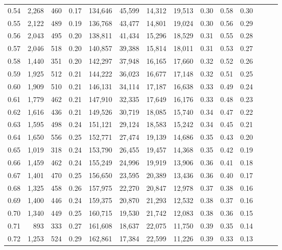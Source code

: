 \begin{tabular}{rrrrrrrrrrrrrr}
0.54 &  2,268 &    460 &  0.17 &  134,646 &   45,599 &  14,312 &  19,513 &  0.30 &  0.58 &      0.30 \\
0.55 &  2,122 &    489 &  0.19 &  136,768 &   43,477 &  14,801 &  19,024 &  0.30 &  0.56 &      0.29 \\
0.56 &  2,043 &    495 &  0.20 &  138,811 &   41,434 &  15,296 &  18,529 &  0.31 &  0.55 &      0.28 \\
0.57 &  2,046 &    518 &  0.20 &  140,857 &   39,388 &  15,814 &  18,011 &  0.31 &  0.53 &      0.27 \\
0.58 &  1,440 &    351 &  0.20 &  142,297 &   37,948 &  16,165 &  17,660 &  0.32 &  0.52 &      0.26 \\
0.59 &  1,925 &    512 &  0.21 &  144,222 &   36,023 &  16,677 &  17,148 &  0.32 &  0.51 &      0.25 \\
0.60 &  1,909 &    510 &  0.21 &  146,131 &   34,114 &  17,187 &  16,638 &  0.33 &  0.49 &      0.24 \\
0.61 &  1,779 &    462 &  0.21 &  147,910 &   32,335 &  17,649 &  16,176 &  0.33 &  0.48 &      0.23 \\
0.62 &  1,616 &    436 &  0.21 &  149,526 &   30,719 &  18,085 &  15,740 &  0.34 &  0.47 &      0.22 \\
0.63 &  1,595 &    498 &  0.24 &  151,121 &   29,124 &  18,583 &  15,242 &  0.34 &  0.45 &      0.21 \\
0.64 &  1,650 &    556 &  0.25 &  152,771 &   27,474 &  19,139 &  14,686 &  0.35 &  0.43 &      0.20 \\
0.65 &  1,019 &    318 &  0.24 &  153,790 &   26,455 &  19,457 &  14,368 &  0.35 &  0.42 &      0.19 \\
0.66 &  1,459 &    462 &  0.24 &  155,249 &   24,996 &  19,919 &  13,906 &  0.36 &  0.41 &      0.18 \\
0.67 &  1,401 &    470 &  0.25 &  156,650 &   23,595 &  20,389 &  13,436 &  0.36 &  0.40 &      0.17 \\
0.68 &  1,325 &    458 &  0.26 &  157,975 &   22,270 &  20,847 &  12,978 &  0.37 &  0.38 &      0.16 \\
0.69 &  1,400 &    446 &  0.24 &  159,375 &   20,870 &  21,293 &  12,532 &  0.38 &  0.37 &      0.16 \\
0.70 &  1,340 &    449 &  0.25 &  160,715 &   19,530 &  21,742 &  12,083 &  0.38 &  0.36 &      0.15 \\
0.71 &    893 &    333 &  0.27 &  161,608 &   18,637 &  22,075 &  11,750 &  0.39 &  0.35 &      0.14 \\
0.72 &  1,253 &    524 &  0.29 &  162,861 &   17,384 &  22,599 &  11,226 &  0.39 &  0.33 &      0.13 \\

\end{tabular}
